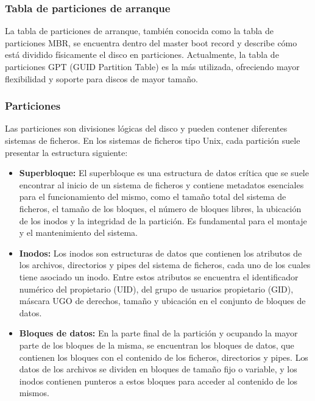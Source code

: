 \subsubsection{Tabla de particiones de arranque}

La tabla de particiones de arranque, también conocida como la tabla de particiones MBR, se encuentra dentro del master boot record y describe cómo está dividido físicamente el disco en particiones. Actualmente, la tabla de particiones GPT (GUID Partition Table) es la más utilizada, ofreciendo mayor flexibilidad y soporte para discos de mayor tamaño.

\subsubsection{Particiones}

Las particiones son divisiones lógicas del disco y pueden contener diferentes sistemas de ficheros. En los sistemas de ficheros tipo Unix, cada partición suele presentar la estructura siguiente:
\begin{itemize}
    \item \textbf{Superbloque:} El superbloque es una estructura de datos crítica que se suele encontrar al inicio de un sistema de ficheros y contiene metadatos esenciales para el funcionamiento del mismo, como el tamaño total del sistema de ficheros, el tamaño de los bloques, el número de bloques libres, la ubicación de los inodos y la integridad de la partición. Es fundamental para el montaje y el mantenimiento del sistema.
    
    \item \textbf{Inodos:} Los inodos son estructuras de datos que contienen los atributos de los archivos, directorios y pipes del sistema de ficheros, cada uno de los cuales tiene asociado un inodo. Entre estos atributos se encuentra el identificador numérico del propietario (UID), del grupo de usuarios propietario (GID), máscara UGO de derechos, tamaño y ubicación en el conjunto de bloques de datos.
    
    \item \textbf{Bloques de datos:} En la parte final de la partición y ocupando la mayor parte de los bloques de la misma, se encuentran los bloques de datos, que contienen los bloques con el contenido de los ficheros, directorios y pipes. Los datos de los archivos se dividen en bloques de tamaño fijo o variable, y los inodos contienen punteros a estos bloques para acceder al contenido de los mismos.
\end{itemize}

